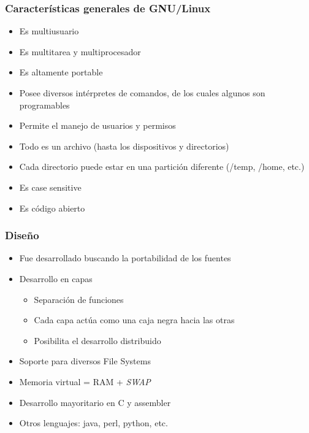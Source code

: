 \begin{frame}
	\frametitle{Características generales de GNU/Linux}
	\begin{itemize}
		\item Es multiusuario
		\item Es multitarea y multiprocesador
		\item Es altamente portable
		\item Posee diversos intérpretes de comandos, de los cuales algunos son programables
		\item Permite el manejo de usuarios y permisos
		\item Todo es un archivo (hasta los dispositivos y directorios)
		\item Cada directorio puede estar en una partición diferente (/temp, /home, etc.)		
		\item Es case sensitive
		\item Es código abierto
	\end{itemize}
\end{frame}

\begin{frame}
	\frametitle{Diseño}
	\begin{itemize}
		\item Fue desarrollado buscando la portabilidad de los fuentes
		\item Desarrollo en capas
		\begin{itemize}
			\item Separación de funciones
			\item Cada capa actúa como una caja negra hacia las otras
			\item Posibilita el desarrollo distribuido
		\end{itemize}
		\item Soporte para diversos File Systems
		\item Memoria virtual = RAM + \textit{SWAP}
		\item Desarrollo mayoritario en C y assembler
		\item Otros lenguajes: java, perl, python, etc.
	\end{itemize}
\end{frame}


